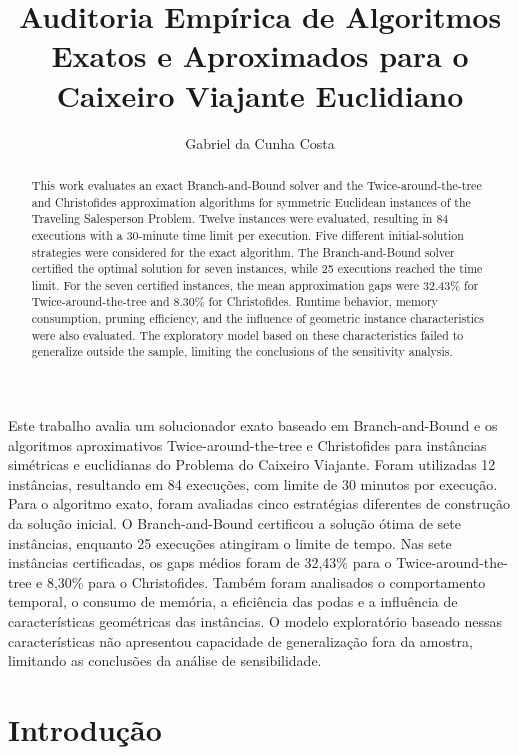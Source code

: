 \documentclass[12pt]{article}
\title{Auditoria Empírica de Algoritmos Exatos e Aproximados para o Caixeiro Viajante Euclidiano}
\author{Gabriel da Cunha Costa}
\begin{document}
\maketitle

\begin{resumo}
Este trabalho avalia um solucionador exato baseado em Branch-and-Bound e os algoritmos aproximativos Twice-around-the-tree e Christofides para instâncias simétricas e euclidianas do Problema do Caixeiro Viajante. Foram utilizadas 12 instâncias, resultando em 84 execuções, com limite de 30 minutos por execução. Para o algoritmo exato, foram avaliadas cinco estratégias diferentes de construção da solução inicial. O Branch-and-Bound certificou a solução ótima de sete instâncias, enquanto 25 execuções atingiram o limite de tempo. Nas sete instâncias certificadas, os gaps médios foram de 32,43\% para o Twice-around-the-tree e 8,30\% para o Christofides. Também foram analisados o comportamento temporal, o consumo de memória, a eficiência das podas e a influência de características geométricas das instâncias. O modelo exploratório baseado nessas características não apresentou capacidade de generalização fora da amostra, limitando as conclusões da análise de sensibilidade.
\end{resumo}

\begin{abstract}
This work evaluates an exact Branch-and-Bound solver and the Twice-around-the-tree and Christofides approximation algorithms for symmetric Euclidean instances of the Traveling Salesperson Problem. Twelve instances were evaluated, resulting in 84 executions with a 30-minute time limit per execution. Five different initial-solution strategies were considered for the exact algorithm. The Branch-and-Bound solver certified the optimal solution for seven instances, while 25 executions reached the time limit. For the seven certified instances, the mean approximation gaps were 32.43\% for Twice-around-the-tree and 8.30\% for Christofides. Runtime behavior, memory consumption, pruning efficiency, and the influence of geometric instance characteristics were also evaluated. The exploratory model based on these characteristics failed to generalize outside the sample, limiting the conclusions of the sensitivity analysis.
\end{abstract}

\section{Introdução}
\end{document}
